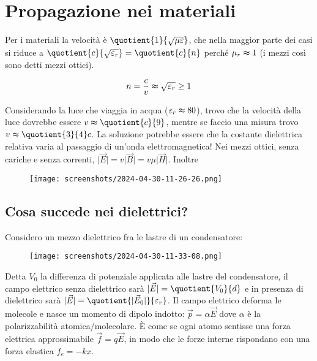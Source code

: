 \section{Propagazione nei materiali}
Per i materiali la velocità è \(\quotient{1}{\sqrt{\mu \varepsilon } } \), che nella maggior parte dei casi si riduce a \(\quotient{c}{\sqrt{\varepsilon _r} }=\quotient{c}{n} \) perché \(\mu _r \thickapprox 1\) (i mezzi così sono detti mezzi ottici).
\begin{definition}
	\begin{equation}
		n = \frac{c}{v} \thickapprox \sqrt{\varepsilon _r}  \geq 1
	\end{equation}
\end{definition}
Considerando la luce che viaggia in acqua (\(\varepsilon _r \thickapprox 80\)), trovo che la velocità della luce dovrebbe essere \(v\thickapprox \quotient{c}{9} \), mentre se faccio una misura trovo \(v \thickapprox \quotient{3}{4} c\). La soluzione potrebbe essere che la costante dielettrica relativa varia al passaggio di un'onda elettromagnetica! Nei mezzi ottici, senza cariche e senza correnti, \(\vert \vec{E} \vert = v \vert \vec{B} \vert = v \mu \vert \vec{H} \vert \). Inoltre
\begin{figure}[H]
	\centering
	\texttt{[image: screenshots/2024-04-30-11-26-26.png]}
\end{figure}

\subsection{Cosa succede nei dielettrici?}
Considero un mezzo dielettrico fra le lastre di un condensatore:
\begin{figure}[H]
	\centering
	\texttt{[image: screenshots/2024-04-30-11-33-08.png]}
\end{figure}
Detta \(V_0\) la differenza di potenziale applicata alle lastre del condensatore, il campo elettrico senza dielettrico sarà \(\vert \vec{E} \vert = \quotient{V_0}{d} \) e in presenza di dielettrico sarà \(\vert \vec{E} \vert = \quotient{\vert \vec{E}_0 \vert }{\varepsilon _r}\). Il campo elettrico deforma le molecole e nasce un momento di dipolo indotto: \(\vec{p}= \alpha \vec{E}\) dove \(\alpha \) è la polarizzabilità atomica/molecolare. È come se ogni atomo sentisse una forza elettrica approssimabile \(\vec{f}= q \vec{E}\), in modo che le forze interne rispondano con una forza elastica \(f_e = -kx\).

